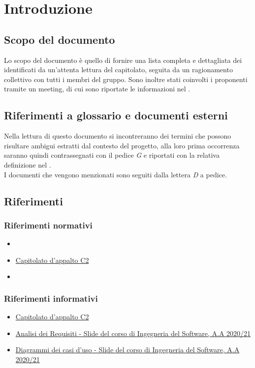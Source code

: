 \section{Introduzione} \label{_introduzione}
\subsection{Scopo del documento}
Lo scopo del documento è quello di fornire una lista completa e dettagliata dei  identificati
da un'attenta lettura del capitolato, seguita da un ragionamento collettivo con tutti i membri del gruppo.
Sono inoltre stati coinvolti i proponenti tramite un meeting, di cui sono riportate le informazioni nel .

\subsection{Riferimenti a glossario e documenti esterni}
Nella lettura di questo documento si incontreranno dei termini che possono risultare ambigui estratti dal contesto
del progetto, alla loro prima occorrenza saranno quindi contrassegnati con il pedice \textit{G} e riportati con la relativa definizione nel . \\
I documenti che vengono menzionati sono seguiti dalla lettera \textit{D} a pedice.

\subsection{Riferimenti}
\subsubsection{Riferimenti normativi}
\begin{itemize}
    \item {}
    \item \href{https://www.math.unipd.it/~tullio/IS-1/2020/Progetto/C2.pdf}{Capitolato d'appalto C2}
    \item {}
\end{itemize}

\subsubsection{Riferimenti informativi}
\begin{itemize}
    \item \href{https://www.math.unipd.it/~tullio/IS-1/2020/Progetto/C2.pdf}{Capitolato d'appalto C2}
    \item \href{https://www.math.unipd.it/~tullio/IS-1/2020/Dispense/L07.pdf}{Analisi dei Requisiti - Slide del corso di Ingegneria del Software, A.A 2020/21}
    \item \href{https://www.math.unipd.it/~rcardin/swea/2021/Diagrammi%20Use%20Case_4x4.pdf}{Diagrammi dei casi d'uso - Slide del corso di Ingegneria del Software, A.A 2020/21}
    
\end{itemize}

